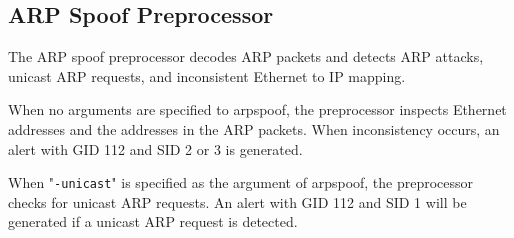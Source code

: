 \documentclass[english]{report}
\begin{document}
%
%
%
%
%
%
%
%
%
%
%    
\subsection{ARP Spoof Preprocessor\label{sub:arpspoof}}

The ARP spoof preprocessor decodes ARP packets and detects ARP attacks, 
unicast ARP requests, and inconsistent Ethernet to IP mapping.

When no arguments are specified to arpspoof, the preprocessor inspects Ethernet
addresses and the addresses in the ARP packets. When inconsistency occurs, an
alert with GID 112 and SID 2 or 3 is generated.

When "\texttt{-unicast}" is specified as the argument of arpspoof, the 
preprocessor checks for unicast ARP requests. An alert with GID 112 and 
SID 1 will be generated if a unicast ARP request is detected.
\end{document}
